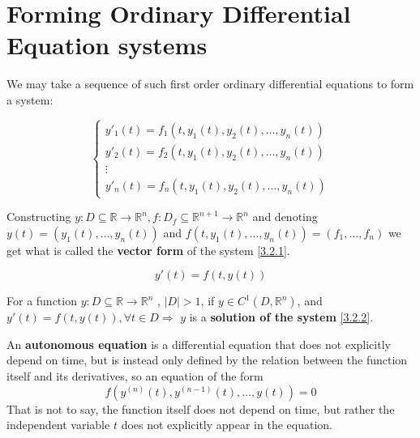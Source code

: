 \section{Forming Ordinary Differential Equation systems}
We may take a sequence of such first order ordinary differential equations to form a system:

\begin{equation}\label{3.2.1}
    \begin{cases}
        y'_1(t) = f_1(t,y_1(t),y_2(t),\dots,y_n(t)) \\
        y'_2(t) = f_2(t,y_1(t),y_2(t),\dots,y_n(t)) \\
        \vdots                                      \\
        y'_n(t) = f_n(t,y_1(t),y_2(t),\dots,y_n(t))
    \end{cases}
\end{equation}

Constructing $y: D \subseteq \mathbb{R} \rightarrow \mathbb{R}^n, f : D_f    \subseteq \mathbb{R}^{n+1} \rightarrow \mathbb{R}^n$ and denoting \\
$y(t)= (y_1(t), \dots, y_n(t))$ and $f(t,y_1(t),\dots,y_n(t)) = (f_1,\dots,f_n) $ we get what is called the \textbf{ vector form} of the system \ref{3.2.1}.

\begin{equation}\label{3.2.2}
    y'(t) = f (t, y(t))
\end{equation}

\begin{definition}
\end{definition}
For a function $y:D \subseteq \mathbb{R} \rightarrow \mathbb{R}^n$ , $|D| > 1$, if $y \in C^1(D,\mathbb{R}^n)$, and $y'(t) = f(t,y(t)), \forall t \in D \Rightarrow$ $y$ is a \textbf{solution of the system} \ref{3.2.2}.



\begin{definition}
    An \textbf{autonomous equation} is a differential equation that does not explicitly depend on time, but is instead only defined by the relation between the function itself and its derivatives, so an equation of the form
    \begin{equation}\label{eq:3.2.3}
        f(y^{(n)}(t), y^{(n-1)}(t), \dots, y(t))= 0
    \end{equation}
    That is not to say, the function itself does not depend on time, but rather the independent variable $t$ does not explicitly appear in the equation.
\end{definition}

